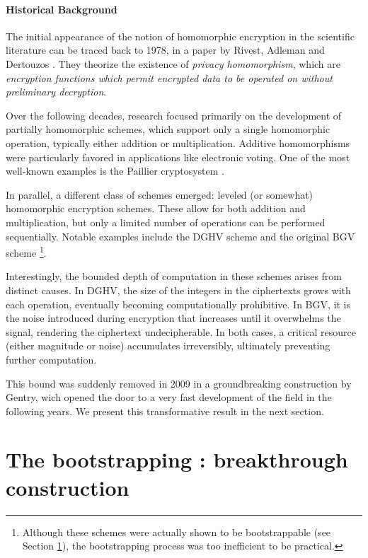 \paragraph{Historical Background}

The initial appearance of the notion of homomorphic encryption in the scientific literature can be traced back to 1978, in a paper by Rivest, Adleman and Dertouzos \cite{RAD78}. They theorize the existence of \textit{privacy homomorphism}, which are \textit{encryption functions which permit encrypted data to be operated on without preliminary decryption}.

Over the following decades, research focused primarily on the development of partially homomorphic schemes, which support only a single homomorphic operation, typically either addition or multiplication. Additive homomorphisms were particularly favored in applications like electronic voting. One of the most well-known examples is the Paillier cryptosystem \cite{EC:Paillier99}.

In parallel, a different class of schemes emerged: leveled (or somewhat) homomorphic encryption schemes. These allow for both addition and multiplication, but only a limited number of operations can be performed sequentially. Notable examples include the DGHV scheme \cite{EC:DGHV10} and the original BGV scheme \cite{bgv}\footnote{Although these schemes were actually shown to be bootstrappable (see Section \ref{sec:gentry_bootstrapping}), the bootstrapping process was too inefficient to be practical.}.

Interestingly, the bounded depth of computation in these schemes arises from distinct causes. In DGHV, the size of the integers in the ciphertexts grows with each operation, eventually becoming computationally prohibitive. In BGV, it is the noise introduced during encryption that increases until it overwhelms the signal, rendering the ciphertext undecipherable. In both cases, a critical resource (either magnitude or noise) accumulates irreversibly, ultimately preventing further computation.

This bound was suddenly removed in 2009 in a groundbreaking construction by Gentry, wich opened the door to a very fast development of the field in the following years. We present this transformative result in the next section.

\section{The bootstrapping : breakthrough construction}
\label{sec:gentry_bootstrapping}


